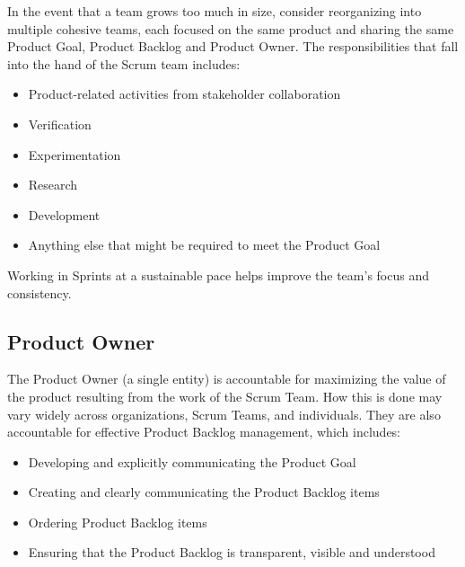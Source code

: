 \begin{flushleft}
	In the event that a team grows too much in size, consider reorganizing into
	multiple cohesive teams, each focused on the same product and sharing the same
	Product Goal, Product Backlog and Product Owner. The responsibilities that fall
	into the hand of the Scrum team includes:
\end{flushleft}

\begin{itemize}
	\item Product-related activities from stakeholder collaboration
	\item Verification
	\item Experimentation
	\item Research
	\item Development
	\item Anything else that might be required to meet the Product Goal
\end{itemize}

\begin{flushleft}
	Working in Sprints at a sustainable pace helps improve the team's focus and consistency.
\end{flushleft}

\subsection{Product Owner}\label{scrum-product-owner}

\begin{flushleft}
	The Product Owner (a single entity) is accountable for maximizing the value of
	the product resulting from the work of the Scrum Team. How this is done may vary
	widely across organizations, Scrum Teams, and individuals. They are also accountable
	for effective Product Backlog management, which includes:
\end{flushleft}

\begin{itemize}
	\item Developing and explicitly communicating the Product Goal
	\item Creating and clearly communicating the Product Backlog items
	\item Ordering Product Backlog items
	\item Ensuring that the Product Backlog is transparent, visible and understood
\end{itemize}


